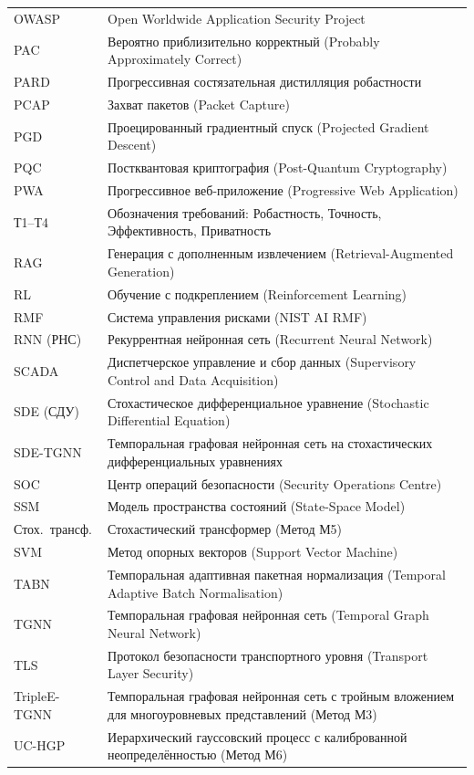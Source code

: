 \begin{longtable}{@{}p{3.8cm} p{10cm}@{}}
OWASP & Open Worldwide Application Security Project \\
PAC & Вероятно приблизительно корректный (Probably Approximately Correct) \\
PARD & Прогрессивная состязательная дистилляция робастности \\
PCAP & Захват пакетов (Packet Capture) \\
PGD & Проецированный градиентный спуск (Projected Gradient Descent) \\
PQC & Постквантовая криптография (Post-Quantum Cryptography) \\
PWA & Прогрессивное веб-приложение (Progressive Web Application) \\
Т1--Т4 & Обозначения требований: Робастность, Точность, Эффективность, Приватность \\
RAG & Генерация с дополненным извлечением (Retrieval-Augmented Generation) \\
RL & Обучение с подкреплением (Reinforcement Learning) \\
RMF & Система управления рисками (NIST AI RMF) \\
RNN (РНС) & Рекуррентная нейронная сеть (Recurrent Neural Network) \\
SCADA & Диспетчерское управление и сбор данных (Supervisory Control and Data Acquisition) \\
SDE (СДУ) & Стохастическое дифференциальное уравнение (Stochastic Differential Equation) \\
SDE-TGNN & Темпоральная графовая нейронная сеть на стохастических дифференциальных уравнениях \\
SOC & Центр операций безопасности (Security Operations Centre) \\
SSM & Модель пространства состояний (State-Space Model) \\
Стох.\ трансф. & Стохастический трансформер (Метод М5) \\
SVM & Метод опорных векторов (Support Vector Machine) \\
TABN & Темпоральная адаптивная пакетная нормализация (Temporal Adaptive Batch Normalisation) \\
TGNN & Темпоральная графовая нейронная сеть (Temporal Graph Neural Network) \\
TLS & Протокол безопасности транспортного уровня (Transport Layer Security) \\
TripleE-TGNN & Темпоральная графовая нейронная сеть с тройным вложением для многоуровневых представлений (Метод М3) \\
UC-HGP & Иерархический гауссовский процесс с калиброванной неопределённостью (Метод М6) \\
\end{longtable}
